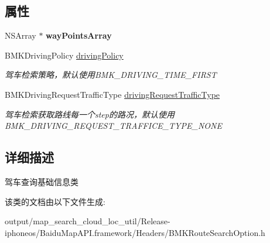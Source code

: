 \subsection*{属性}
\begin{DoxyCompactItemize}
\item 
\hypertarget{interface_b_m_k_driving_route_plan_option_a13b365a390f0ccfc2f2b5d16927eb9db}{}N\+S\+Array $\ast$ {\bfseries way\+Points\+Array}\label{interface_b_m_k_driving_route_plan_option_a13b365a390f0ccfc2f2b5d16927eb9db}

\item 
\hypertarget{interface_b_m_k_driving_route_plan_option_a51fe8957c72c8d0d478515bd7afa0cfd}{}B\+M\+K\+Driving\+Policy \hyperlink{interface_b_m_k_driving_route_plan_option_a51fe8957c72c8d0d478515bd7afa0cfd}{driving\+Policy}\label{interface_b_m_k_driving_route_plan_option_a51fe8957c72c8d0d478515bd7afa0cfd}

\begin{DoxyCompactList}\small\item\em 驾车检索策略，默认使用\+B\+M\+K\+\_\+\+D\+R\+I\+V\+I\+N\+G\+\_\+\+T\+I\+M\+E\+\_\+\+F\+I\+R\+S\+T \end{DoxyCompactList}\item 
\hypertarget{interface_b_m_k_driving_route_plan_option_a89b3bd09b9fbaf62bd06b2309522be1c}{}B\+M\+K\+Driving\+Request\+Traffic\+Type \hyperlink{interface_b_m_k_driving_route_plan_option_a89b3bd09b9fbaf62bd06b2309522be1c}{driving\+Request\+Traffic\+Type}\label{interface_b_m_k_driving_route_plan_option_a89b3bd09b9fbaf62bd06b2309522be1c}

\begin{DoxyCompactList}\small\item\em 驾车检索获取路线每一个step的路况，默认使用\+B\+M\+K\+\_\+\+D\+R\+I\+V\+I\+N\+G\+\_\+\+R\+E\+Q\+U\+E\+S\+T\+\_\+\+T\+R\+A\+F\+F\+I\+C\+E\+\_\+\+T\+Y\+P\+E\+\_\+\+N\+O\+N\+E \end{DoxyCompactList}\end{DoxyCompactItemize}


\subsection{详细描述}
驾车查询基础信息类 

该类的文档由以下文件生成\+:\begin{DoxyCompactItemize}
\item 
output/map\+\_\+search\+\_\+cloud\+\_\+loc\+\_\+util/\+Release-\/iphoneos/\+Baidu\+Map\+A\+P\+I.\+framework/\+Headers/B\+M\+K\+Route\+Search\+Option.\+h\end{DoxyCompactItemize}
